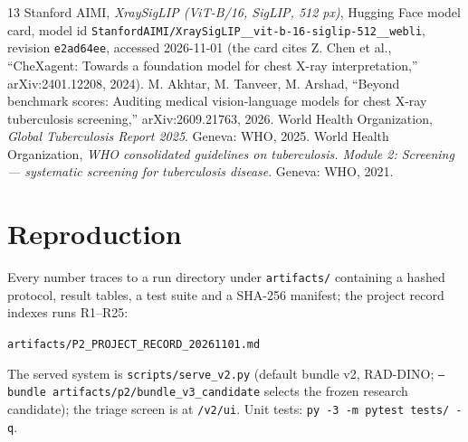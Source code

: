 \documentclass[12pt,a4paper]{report}
\newcommand{\code}[1]{\texttt{#1}}
\begin{document}
\begin{thebibliography}{13}
 Stanford AIMI, \emph{XraySigLIP (ViT-B/16, SigLIP, 512 px)}, Hugging Face model card, model id \code{StanfordAIMI/XraySigLIP\_\_vit-b-16-siglip-512\_\_webli}, revision \code{e2ad64ee}, accessed 2026-11-01 (the card cites Z. Chen et al., ``CheXagent: Towards a foundation model for chest X-ray interpretation,'' arXiv:2401.12208, 2024).
 M. Akhtar, M. Tanveer, M. Arshad, ``Beyond benchmark scores: Auditing medical vision-language models for chest X-ray tuberculosis screening,'' arXiv:2609.21763, 2026.
 World Health Organization, \emph{Global Tuberculosis Report 2025}. Geneva: WHO, 2025.
 World Health Organization, \emph{WHO consolidated guidelines on tuberculosis. Module 2: Screening --- systematic screening for tuberculosis disease}. Geneva: WHO, 2021.
\end{thebibliography}

\appendix
\chapter{Reproduction}
Every number traces to a run directory under \code{artifacts/} containing a hashed protocol, result tables, a test suite and a SHA-256 manifest; the project record indexes runs R1--R25:
\begin{center}\code{artifacts/P2\_PROJECT\_RECORD\_20261101.md}\end{center} The served system is \code{scripts/serve\_v2.py} (default bundle v2, RAD-DINO; \code{--bundle artifacts/p2/bundle\_v3\_candidate} selects the frozen research candidate); the triage screen is at \code{/v2/ui}. Unit tests: \code{py -3 -m pytest tests/ -q}.
\end{document}
